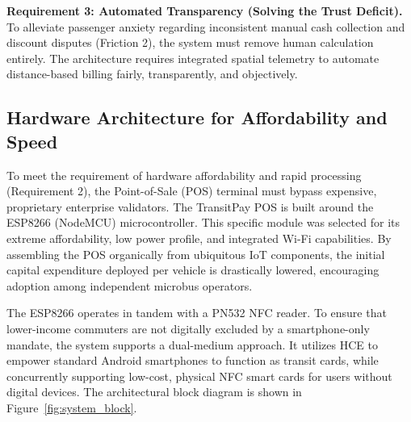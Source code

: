 \documentclass[manuscript,review,anonymous]{acmart}
\begin{document}
\textbf{Requirement 3: Automated Transparency (Solving the Trust Deficit).} To alleviate passenger anxiety regarding inconsistent manual cash collection and discount disputes (Friction 2), the system must remove human calculation entirely. The architecture requires integrated spatial telemetry to automate distance-based billing fairly, transparently, and objectively.

\subsection{Hardware Architecture for Affordability and Speed}
To meet the requirement of hardware affordability and rapid processing (Requirement 2), the Point-of-Sale (POS) terminal must bypass expensive, proprietary enterprise validators. The TransitPay POS is built around the ESP8266 (NodeMCU) microcontroller. This specific module was selected for its extreme affordability, low power profile, and integrated Wi-Fi capabilities. By assembling the POS organically from ubiquitous IoT components, the initial capital expenditure deployed per vehicle is drastically lowered, encouraging adoption among independent microbus operators.

The ESP8266 operates in tandem with a PN532 NFC reader. To ensure that lower-income commuters are not digitally excluded by a smartphone-only mandate, the system supports a dual-medium approach. It utilizes HCE to empower standard Android smartphones to function as transit cards, while concurrently supporting low-cost, physical NFC smart cards for users without digital devices. The architectural block diagram is shown in Figure~\ref{fig:system_block}.
\end{document}
